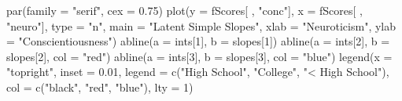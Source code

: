 \begin{Schunk}
\begin{Sinput}
 par(family = "serif", cex = 0.75)
 plot(y = fScores[ , "conc"],
      x = fScores[ , "neuro"],
      type = "n",
      main = "Latent Simple Slopes",
      xlab = "Neuroticism",
      ylab = "Conscientiousness")
 abline(a = ints[1], b = slopes[1])
 abline(a = ints[2], b = slopes[2], col = "red")
 abline(a = ints[3], b = slopes[3], col = "blue")
 legend(x = "topright",
        inset = 0.01,
        legend =
            c("High School",
              "College",
              "< High School"),
        col =
            c("black",
              "red",
              "blue"),
        lty = 1)
\end{Sinput}
\end{Schunk}
